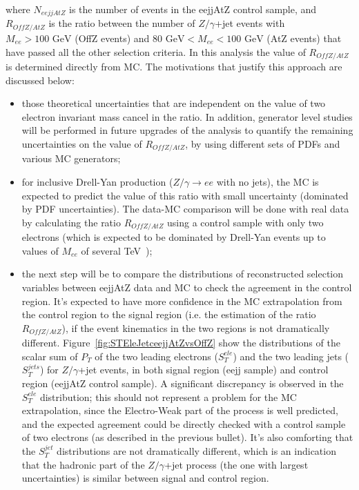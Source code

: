 where $N_{eejjAtZ}$ is the number of events in the eejjAtZ control sample, and 
$R_{OffZ/AtZ}$ is the ratio between the number of $Z/\gamma$+jet events 
with $M_{ee} > 100\mbox{ GeV}$ (OffZ events) and $80\mbox{ GeV} < M_{ee} < 100\mbox{ GeV}$ 
(AtZ events) that have passed all the other selection criteria.
In this analysis the value of $R_{OffZ/AtZ}$ is determined directly from MC.
The motivations that justify this approach are discussed below:
%
\begin{itemize}
%
\item those theoretical uncertainties that are independent 
on the value of two electron invariant mass cancel in the ratio.
In addition, generator level studies will be performed 
in future upgrades of the analysis to quantify the
remaining uncertainties on the value of $R_{OffZ/AtZ}$, 
by using different sets of PDFs and various MC generators;
%
%
\item for inclusive Drell-Yan production ($Z/\gamma \rightarrow ee$ with no jets), 
the MC is expected to predict the value of this ratio with small 
uncertainty (dominated by PDF uncertainties). 
The data-MC comparison will be done with real data by calculating 
the ratio $R_{OffZ/AtZ}$ using a control sample with only two electrons 
(which is expected to be dominated by Drell-Yan events 
up to values of $M_{ee}$ of several TeV~\cite{HEEPNOTE});
%
\item the next step will be to compare the distributions of reconstructed selection 
variables between eejjAtZ data and MC to check the agreement in the control region.
It's expected to have more confidence in the MC extrapolation 
from the control region to the signal region (i.e. the estimation of the ratio $R_{OffZ/AtZ}$), 
if the event kinematics in the two regions is not dramatically different.
Figure~\ref{fig:STEleJetceejjAtZvsOffZ}
show the distributions of the scalar sum of $P_{T}$ of the two leading electrons ($S_{T}^{ele}$) 
and the two leading jets ($S_{T}^{jets}$) for $Z/\gamma$+jet events, 
in both signal region (eejj sample) and control region (eejjAtZ control sample). 
A significant discrepancy is observed 
in the $S_{T}^{ele}$ distribution; this should not represent 
a problem for the MC extrapolation, since the Electro-Weak part of the process 
is well predicted, and the expected agreement could be directly checked with a control sample 
of two electrons (as described in the previous bullet).
It's also comforting that the $S_{T}^{jet}$ distributions are not dramatically different, 
which is an indication that the hadronic part of the $Z/\gamma$+jet process 
(the one with largest uncertainties) is similar between 
signal and control region.  
%
\end{itemize}

